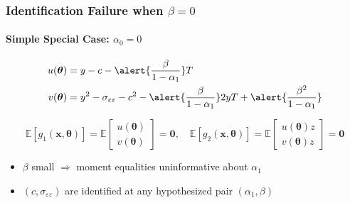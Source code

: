 \documentclass{beamer}
\begin{document}
%
\begin{frame}
  \frametitle{Identification Failure when $\beta= 0$}
\framesubtitle{Simple Special Case: $\alpha_0 = 0$}

  \vspace{-2em}

\begin{align*}
  u(\boldsymbol{\theta}) &= y - c - \alert{\frac{\beta}{1 - \alpha_1}} T\\
  v(\boldsymbol{\theta}) &= y^2 - \sigma_{\varepsilon\varepsilon} - c^2 - \alert{\frac{\beta}{1 - \alpha_1}} 2yT + \alert{\frac{\beta^2}{1 - \alpha_1}}
\end{align*}

\vspace{-1em}

\[
  \mathbb{E}\left[ g_1(\mathbf{x}, \boldsymbol{\theta}) \right] = \mathbb{E}
  \left[
  \begin{array}{c}
    u(\boldsymbol{\theta})\\ v(\boldsymbol{\theta})
  \end{array}
\right] = \mathbf{0}, \quad
\mathbb{E}\left[ g_2(\mathbf{x}, \boldsymbol{\theta}) \right] = \mathbb{E}
  \left[
  \begin{array}{c}
    u(\boldsymbol{\theta}) z\\ v(\boldsymbol{\theta}) z
  \end{array}
\right] = \mathbf{0}
\]

\begin{itemize}
  \item $\beta$ small $\Rightarrow$ moment equalities uninformative about $\alpha_1$
  \item $(c,\sigma_{\varepsilon\varepsilon})$ are identified at any hypothesized pair $(\alpha_1, \beta)$
\end{itemize}


\end{frame}
\end{document}
